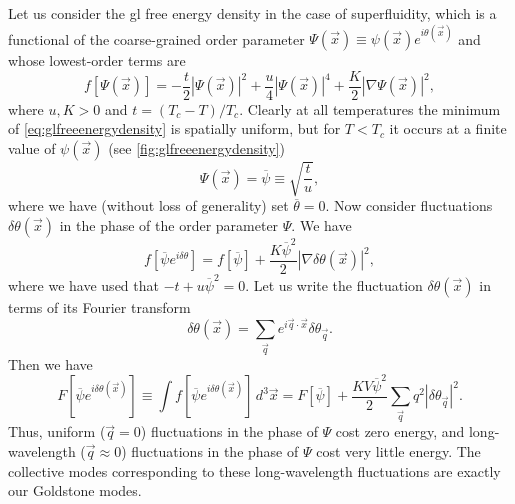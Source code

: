 Let us consider the \gls{gl} free energy density in the case of superfluidity, which is a functional of the coarse-grained order parameter $\Psi(\vec{x}) \equiv \psi(\vec{x})e^{i\theta(\vec{x})}$ and whose lowest-order terms are
\begin{equation}\label{eq:glfreeenergydensity}
f[\Psi(\vec{x})] = -\frac{t}{2}|\Psi(\vec{x})|^2+\frac{u}{4}|\Psi(\vec{x})|^4+\frac{K}{2}|\nabla \Psi(\vec{x})|^2,
\end{equation}
where $u,K>0$ and $t=(T_c-T)/T_c$.
Clearly at all temperatures the minimum of \cref{eq:glfreeenergydensity} is spatially uniform, but for $T<T_c$ it occurs at a finite value of $\psi(\vec{x})$ (see \cref{fig:glfreeenergydensity})
\begin{equation}
\Psi(\vec{x}) = \overline{\psi} \equiv \sqrt{\frac{t}{u}},
\end{equation}
where we have (without loss of generality) set $\overline{\theta} = 0$.
Now consider fluctuations $\delta \theta(\vec{x})$ in the phase of the order parameter $\Psi$.
We have
\begin{equation}
f[\overline{\psi}e^{i\delta \theta}] = f[\overline{\psi}]+\frac{K\overline{\psi}^2}{2}|\nabla \delta \theta(\vec{x})|^2,
\end{equation}
where we have used that $-t+u\overline{\psi}^2=0$.
Let us write the fluctuation $\delta \theta(\vec{x})$ in terms of its Fourier transform
\begin{equation}
\delta \theta(\vec{x}) = \sum_{\vec{q}} e^{i\vec{q}\cdot\vec{x}}\delta \theta_{\vec{q}}.
\end{equation}
Then we have
\begin{equation}
F[\overline{\psi}e^{i\delta \theta(\vec{x})}] \equiv \int f[\overline{\psi}e^{i\delta\theta(\vec{x})}] \, d^3\vec{x} = F[\overline{\psi}]+\frac{KV\overline{\psi}^2}{2}\sum_{\vec{q}} q^2|\delta \theta_{\vec{q}}|^2.
\end{equation}
Thus, uniform ($\vec{q}=0$) fluctuations in the phase of $\Psi$ cost zero energy, and long-wavelength ($\vec{q}\approx0$) fluctuations in the phase of $\Psi$ cost very little energy.
The collective modes corresponding to these long-wavelength fluctuations are exactly our Goldstone modes.


